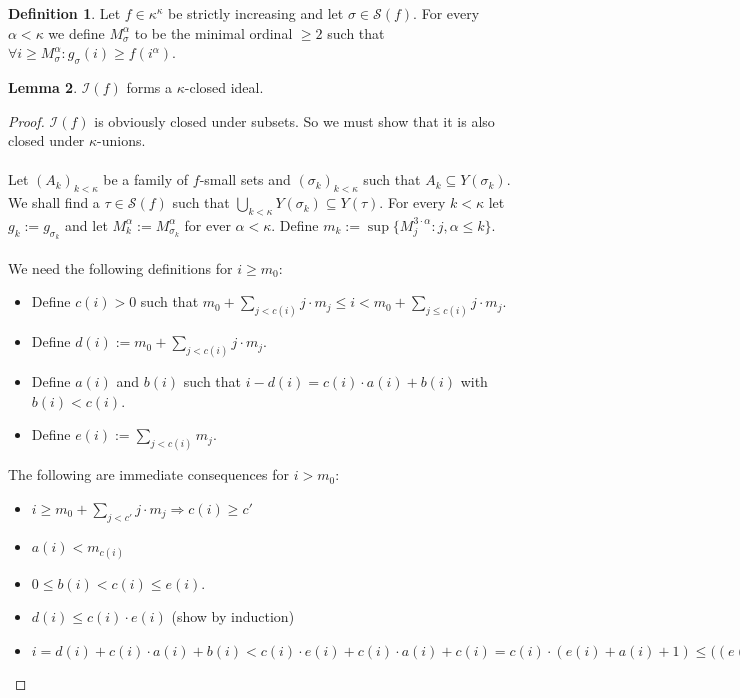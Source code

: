\documentclass[12pt,a4paper]{scrartcl}
\theoremstyle{definition}
\newtheorem{definition}{Definition}[section]
\newtheorem{lemma}[definition]{Lemma}
\numberwithin{equation}{section}
\begin{document}
\begin{definition}
Let $f \in \kappa^\kappa$ be strictly increasing and let $\sigma \in \mathcal{S}(f)$. For every $\alpha < \kappa$ we define $M_\sigma^\alpha$ to be the minimal ordinal $\geq 2$ such that $\forall i \geq M_\sigma ^\alpha \colon g_\sigma(i) \geq f(i^\alpha)$.
\end{definition}



\begin{lemma}
$\mathcal{I}(f)$ forms a $\kappa$-closed ideal.
\end{lemma}

\begin{proof}
$\mathcal{I}(f)$ is obviously closed under subsets. So we must show that it is also closed under $\kappa$-unions.\\
\\
Let $(A_k)_{k< \kappa}$ be a family of $f$-small sets and $(\sigma_k)_{k<\kappa}$ such that $A_k \subseteq Y(\sigma_k)$. We shall find a $\tau \in \mathcal{S}(f)$ such that $\bigcup_{k <\kappa} Y(\sigma_k) \subseteq Y(\tau)$. For every $k < \kappa$ let $g_k:=g_{\sigma_k}$ and let $M_k^\alpha:= M_{\sigma_k}^\alpha$ for ever $\alpha < \kappa$. Define $m_k :=\sup\{M_j^{3 \cdot \alpha} \colon j, \alpha \leq k\}$.\\
\\
We need the following definitions for $i \geq m_0$:
\begin{itemize}
\item Define $c(i) >0$ such that $m_0 + \sum_{j < c(i)} j \cdot m_j \leq i < m_0 + \sum_{j \leq c(i)} j \cdot m_j$.
\item Define $d(i):= m_0 +  \sum_{j < c(i)} j \cdot m_j$.
\item Define $a(i)$ and $b(i)$ such that $i - d(i) = c(i) \cdot a(i) + b(i)$ with $b(i) < c(i)$.
\item Define $e(i):=\sum_{j < c(i)}  m_j$.
\end{itemize}
The following are immediate consequences for $i > m_0$:
\begin{itemize}
\item $i \geq m_0 + \sum_{j < c'} j \cdot m_j \Rightarrow c(i) \geq c'$
\item $a(i) < m_{c(i)}$
\item $0 \leq b(i) < c(i) \leq e(i)$.
\item $d(i) \leq c(i) \cdot e(i)$  (show by induction)
\item $i= d(i) + c(i) \cdot a(i) + b(i) < c(i) \cdot e(i) + c(i) \cdot a(i) + c(i) = c(i) \cdot (e(i) + a(i) + 1) \leq ((e(i) + a(i)) \cdot (e(i) + a(i) + 1) \leq ((e(i) + a(i))^3$

\end{itemize}
\end{proof}
\end{document}
